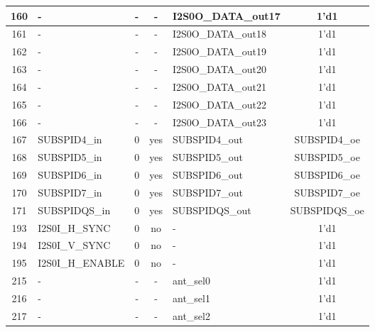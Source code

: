 \begin{longtable}[c]{|c|l|c|c|l|c|}
160  &                        -  &  -  &    -  &      I2S0O\_DATA\_out17  &               1'd1  \\\hline
161  &                        -  &  -  &    -  &      I2S0O\_DATA\_out18  &               1'd1  \\\hline
162  &                        -  &  -  &    -  &      I2S0O\_DATA\_out19  &               1'd1  \\\hline
163  &                        -  &  -  &    -  &      I2S0O\_DATA\_out20  &               1'd1  \\\hline
164  &                        -  &  -  &    -  &      I2S0O\_DATA\_out21  &               1'd1  \\\hline
165  &                        -  &  -  &    -  &      I2S0O\_DATA\_out22  &               1'd1  \\\hline
166  &                        -  &  -  &    -  &      I2S0O\_DATA\_out23  &               1'd1  \\\hline
167  &             SUBSPID4\_in  &  0  &  yes  &           SUBSPID4\_out  &       SUBSPID4\_oe  \\\hline
168  &             SUBSPID5\_in  &  0  &  yes  &           SUBSPID5\_out  &       SUBSPID5\_oe  \\\hline
169  &             SUBSPID6\_in  &  0  &  yes  &           SUBSPID6\_out  &       SUBSPID6\_oe  \\\hline
170  &             SUBSPID7\_in  &  0  &  yes  &           SUBSPID7\_out  &       SUBSPID7\_oe  \\\hline
171  &            SUBSPIDQS\_in  &  0  &  yes  &          SUBSPIDQS\_out  &      SUBSPIDQS\_oe  \\\hline
193  &           I2S0I\_H\_SYNC  &  0  &   no  &                       -  &               1'd1  \\\hline
194  &           I2S0I\_V\_SYNC  &  0  &   no  &                       -  &               1'd1  \\\hline
195  &         I2S0I\_H\_ENABLE  &  0  &   no  &                       -  &               1'd1  \\\hline
215  &                        -  &  -  &    -  &               ant\_sel0  &               1'd1  \\\hline
216  &                        -  &  -  &    -  &               ant\_sel1  &               1'd1  \\\hline
217  &                        -  &  -  &    -  &               ant\_sel2  &               1'd1  \\\hline

\end{longtable}

